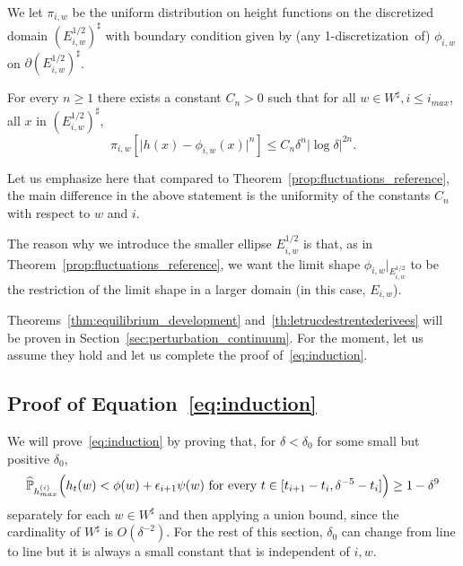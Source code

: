 \documentclass[AHL,Unicode,longabstracts,published]{cedram}
\renewcommand{\P}{\mathbb{P}}
\newcommand{\abs}[1]{\lvert #1 \rvert}
\newcommand{\eps}{\epsilon}
\renewcommand{\d}{{\sharp }}
\let\oldhat\hat
\renewcommand*{\hat}[1]{\mathchoice{\widehat{#1}}{\widehat{#1}}{\oldhat{#1}}{\oldhat{#1}}}
\begin{document}
\begin{defi}\label{piiw}
We let $\pi_{i,w}$ be the uniform distribution on height functions on the discretized domain $(E^{1/2}_{i,w})^\d$ with boundary condition given by (any 1-discretiza\-tion~of) $\phi_{i,w}$ on $\partial (E^{1/2}_{i,w})^\d$.
\end{defi}



\begin{theo}\label{th:letrucdestrentederivees}
For every $n\ge1$ there exists a constant $C_n > 0$ such that for all $w\in W^\d,i\le i_{max}$, all $x$ in $(E^{1/2}_{i,w})^\d$,
\begin{equation}\label{eq:letruc}
\pi_{i,w}\left[\Big| h(x) - \phi_{i,w}(x) \Big|^n\right] \leq C_n \delta^{n} \abs{\log\delta}^{2n}.
\end{equation}
\end{theo}

Let us emphasize here that compared to Theorem~\ref{prop:fluctuations_reference}, the main difference in the above statement is the uniformity of the constants $C_n$ with respect to $w$ and $i$.

The reason why we introduce the smaller ellipse $E^{1/2}_{i,w}$ is that, as in Theorem~\ref{prop:fluctuations_reference}, we want the limit shape $\phi_{i,w}|_{E^{1/2}_{i,w}}$ to be the restriction of the limit shape in a larger domain (in this case, $E_{i,w}$).

Theorems~\ref{thm:equilibrium_development} and~\ref{th:letrucdestrentederivees} will be proven in Section~\ref{sec:perturbation_continuum}. For the moment, let us assume they hold and let us complete the proof of~\eqref{eq:induction}.


\subsection{Proof of Equation~\eqref{eq:induction}}\label{sec:proof52}


We will prove~\eqref{eq:induction} by proving that, for $\delta<\delta_0$ for some small but positive $\delta_0$,
\begin{equation}\label{eq:induction2}
\hat\P_{h^{(i)}_{max}} \Big(h_t(w) < \phi(w) + \eps_{i+1} \psi(w) \text{ for every } t\in [t_{i+1} - t_i, \delta^{-5}- t_i]\Big) \geq 1 - \delta^9
\end{equation}
separately for each $w\in W^\d$ and then applying a union bound, since the cardinality of $W^\d$ is $O(\delta^{-2})$. For the rest of this section, $\delta_0$ can change from line to line but it is always a small constant that is independent of $i,w$.
\end{document}
